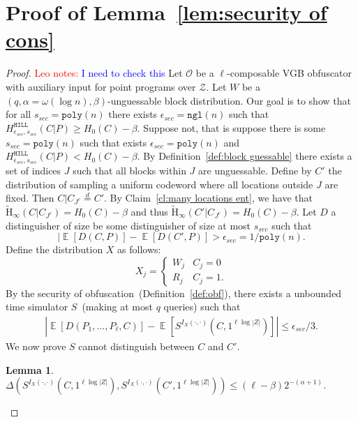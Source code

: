 \documentclass[11pt]{article}
\newcommand{\defref}[1]{\mbox{Definition~\ref{#1}}}
\newcommand{\lemref}[1]{\mbox{Lemma~\ref{#1}}}
\newcommand{\clref}[1]{\mbox{Claim~\ref{#1}}}
\DeclareMathOperator*{\expe}{\mathbb{E}}
\newcommand{\hill}{\ensuremath{\mathtt{HILL}}\xspace}
\newcommand{\poly}{\ensuremath{\mathtt{poly}}\xspace}
\newcommand{\ngl}{\ensuremath{\mathtt{ngl}}\xspace}
\newcommand{\Hav}{\tilde{\mathrm{H}}_\infty}
\newtheorem{lemma}[theorem]{Lemma}
\newcommand{\authnote}[2]{{\textcolor{red}{\textsf{#1 notes: }\textcolor{blue}{ #2}}\marginpar{\textcolor{red}{\textbf{!!!!!}}}}}
\newcommand{\authnote}[2]{}
\newcommand{\lnote}[1]{{\authnote{Leo}{#1}}}
\begin{document}
\section{Proof of \lemref{lem:security of cons}}
\label{app:security of main cons}
\begin{proof}
\lnote{I need to check this}
Let $\mathcal{O}$ be a $\ell$-composable VGB obfuscator with auxiliary input for point programs over $\mathcal{Z}$.  Let $W$ be a $(q, \alpha = \omega(\log n), \beta)$-unguessable block distribution.  Our goal is to show that for all $s_{sec} = \poly(n)$ there exists $\epsilon_{sec} =\ngl(n)$ such that $H^{\hill}_{\epsilon_{sec}, s_{sec}}(C|P)\geq H_0(C)- \beta$. %
Suppose not, that is suppose there is some $s_{sec} = \poly(n)$ such that exists $\epsilon_{sec} = \poly(n)$ and $H^{\hill}_{\epsilon_{sec}, s_{sec}}(C|P) < H_0(C)-\beta$.
By \defref{def:block guessable} there exists a set of indices $J$ such that all blocks within $J$ are unguessable.  Define by $C'$ the distribution of sampling a uniform codeword where all locations outside $J$ are fixed.  Then $C | C_{J^c} \overset{d}=C'$.  By \clref{cl:many locations ent}, we have that $\Hav(C|C_{J^c} )= H_0(C) -\beta$ and thus $\Hav(C'| C_{J^c}) = H_0(C) -\beta$.
Let $D$ a distinguisher of size be some distinguisher of size at most $s_{sec}$ such that
\[
| \expe[D(C, P)] - \expe[D(C', P)] > \epsilon_{sec} = 1/\poly(n).
\]
Define the distribution $X$ as follows:
\[X_j =
\begin{cases}
W_j & C_j = 0\\
R_j & C_j = 1.
\end{cases}\]  By the security of obfuscation~(\defref{def:obf}), there exists a unbounded time simulator $S$~(making at most $q$ queries) such that
\begin{align}
\label{eq:dist before}
|\expe [D(P_1,..., P_\ell, C)] - \expe [S^{I_X(\cdot, \cdot)}(C, 1^{\ell \log |Z|})] |\leq \epsilon_{sec}/3.
\end{align}
We now prove $S$ cannot distinguish between $C$ and $C'$.
\begin{lemma}
\label{lem:sim cannot distinguish}
$\Delta(S^{I_X(\cdot, \cdot)}(C, 1^{\ell \log |Z|}), S^{I_X(\cdot, \cdot)}(C', 1^{\ell \log |Z|})) \le (\ell-\beta) 2^{-(\alpha+1)}$.
\end{lemma}


\end{proof}
\end{document}
